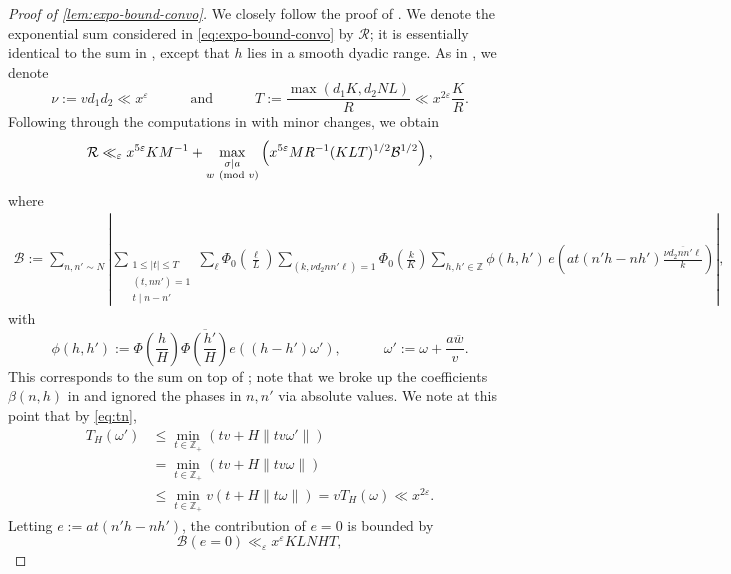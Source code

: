 \documentclass[reqno,11pt]{amsart}
\theoremstyle{remark}
\numberwithin{equation}{section}
\newcommand{\Z}{\mathbb{Z}}
\newcommand{\mB}{\mathcal{B}}
\newcommand{\mR}{\mathcal{R}}
\newcommand{\eps}{\varepsilon}
\renewcommand{\bar}{\overline}
\renewcommand{\pmod}[1]{\ (\textnormal{mod } #1)}
\begin{document}
\begin{proof}[Proof of \cref{lem:expo-bound-convo}]
We closely follow the proof of \cite[Proposition 1]{drappeau2015theoremes}. We denote the exponential sum considered in \cref{eq:expo-bound-convo} by $\mR$; it is essentially identical to the sum in \cite[Section 3.5]{drappeau2015theoremes}, except that $h$ lies in a smooth dyadic range. As in \cite[Section 3.5]{drappeau2015theoremes}, we denote
\[
    \nu := vd_1 d_2 \ll x^\eps
    \qquad\quad 
    \text{and} 
    \qquad\quad 
    T := \frac{\max(d_1 K, d_2 NL)}{R} \ll x^{2\eps} \frac{K}{R}.
\] 
Following through the computations in \cite[p.\,844--846]{drappeau2015theoremes} with minor changes, we obtain
\begin{equation} \label{eq:R-split}
    \mR \ll_\eps x^{5\eps} K M^{-1} +
    \max_{\substack{\sigma \mid a \\ w \pmod{v}}} \left( x^{5\eps} M R^{-1} (KLT)^{1/2} \mB^{1/2} \right),
\end{equation}
where
\[
\begin{aligned}
    \mB := 
    \sum_{n, n' \sim N}
    \left \vert
    \sum_{\substack{1 \le |t| \le T \\ (t, nn') = 1 \\ t \mid n - n'}}
    \sum_{\ell}
    \Phi_0\left(\frac{\ell}{L}\right) 
    \sum_{(k, \nu d_2 nn'\ell) = 1}
    \Phi_0\left(\frac{k}{K}\right) 
    \sum_{h, h' \in \Z} \phi(h, h')\, 
    e\left(a t (n'h - nh') \frac{\bar{\nu d_2 nn'\ell}}{k}\right) \right \vert,
\end{aligned}
\]
with 
\[
    \phi(h, h') := \Phi\left(\frac{h}{H}\right) \bar{\Phi\left(\frac{h'}{H}\right)} e\left((h-h')\omega' \right),
    \qquad\quad 
    \omega' := \omega + \frac{a \bar{w}}{v}.
\]
This corresponds to the sum on top of \cite[p.\,847]{drappeau2015theoremes}; note that we broke up the coefficients $\beta(n, h)$ in \cite[p.\,846]{drappeau2015theoremes} and ignored the phases in $n, n'$ via absolute values. We note at this point that by \cref{eq:tn},
\[
\begin{aligned}
    T_H(\omega') &\le \min_{t \in \Z_+} \left(tv + H\|tv\omega'\|\right)
    \\
    &= \min_{t \in \Z_+} \left(tv + H\|tv\omega\|\right)
    \\
    &\le \min_{t \in \Z_+} v\left(t + H\|t\omega\|\right)
    =
    v T_H(\omega) \ll x^{2\eps}.
\end{aligned}
\]
Letting $e := at(n'h - nh')$, the contribution of $e = 0$ is bounded by
\[
    \mB(e = 0) \ll_\eps x^{\eps} K L N H T,
\]
\end{proof}
\end{document}
